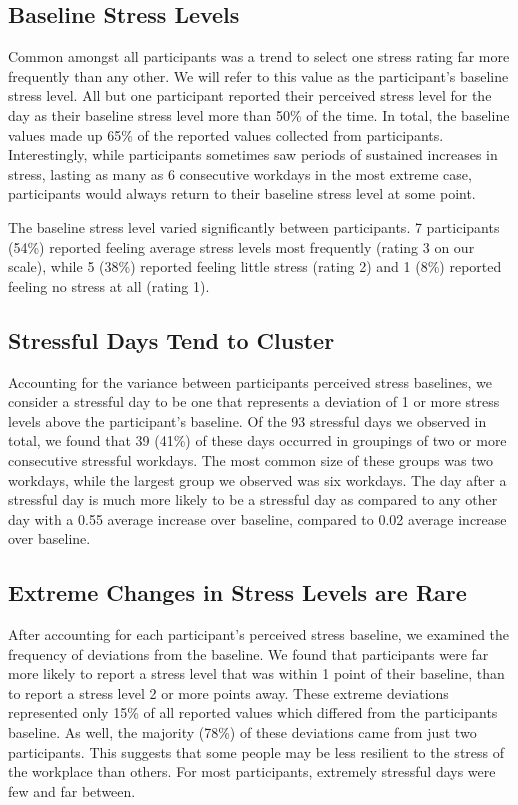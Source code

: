 \subsection{Baseline Stress Levels}
Common amongst all participants was a trend to select one stress rating
far more frequently than any other. We will refer to this value as the
participant's baseline stress level. All but one participant reported
their perceived stress level for the day as their baseline stress
level more than 50\% of the time. In total, the baseline values made
up 65\% of the reported values collected from
participants. Interestingly, while participants sometimes saw periods
of sustained increases in stress, lasting as many as 6 consecutive
workdays in the most extreme case, participants would always return to
their baseline stress level at some point.

The baseline stress level varied significantly between participants. 7
participants (54\%) reported feeling average stress levels most frequently
(rating 3 on our scale), while 5 (38\%) reported feeling little stress
(rating 2) and 1 (8\%) reported feeling no stress at all (rating 1).

\subsection{Stressful Days Tend to Cluster}
Accounting for the variance between participants perceived stress
baselines, we consider a stressful day to be one that represents a
deviation of 1 or more stress levels above the participant's
baseline. Of the 93 stressful days we observed in total, we found that
39 (41\%) of these days occurred in groupings of two or more
consecutive stressful workdays. The most common size of these groups
was two workdays, while the largest group we observed was six
workdays.  The day after a stressful day is much more likely to be a
stressful day as compared to any other day with a 0.55 average increase
over baseline, compared to 0.02 average increase over baseline.

\subsection{Extreme Changes in Stress Levels are Rare}
After accounting for each participant's perceived stress baseline, we
examined the frequency of deviations from the baseline. We found that
participants were far more likely to report a stress level that was
within 1 point of their baseline, than to report a stress level 2 or
more points away. These extreme deviations represented only 15\% of
all reported values which differed from the participants baseline. As
well, the majority (78\%) of these deviations came from just two
participants. This suggests that some people may be less resilient to
the stress of the workplace than others. For most participants,
extremely stressful days were few and far between.

